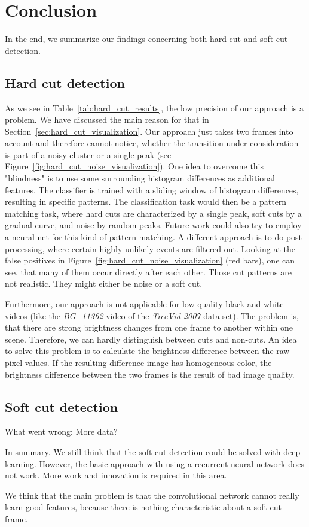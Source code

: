 \section{Conclusion}
\label{sec:conclusion}
In the end, we summarize our findings concerning both hard cut and soft cut detection.

\subsection{Hard cut detection}
\label{sec:conclusion_hard_cut}

As we see in Table~\ref{tab:hard_cut_results}, the low precision of our approach is a problem.
We have discussed the main reason for that in Section~\ref{sec:hard_cut_visualization}.
Our approach just takes two frames into account and therefore cannot notice, whether the transition under consideration is part of a noisy cluster or a single peak (see Figure~\ref{fig:hard_cut_noise_visualization}).
One idea to overcome this "blindness" is to use some surrounding histogram differences as additional features.
The classifier is trained with a sliding window of histogram differences, resulting in specific patterns.
The classification task would then be a pattern matching task, where hard cuts are characterized by a single peak, soft cuts by a gradual curve, and noise by random peaks.
Future work could also try to employ a neural net for this kind of pattern matching.
A different approach is to do post-processing, where certain highly unlikely events are filtered out.
Looking at the false positives in Figure~\ref{fig:hard_cut_noise_visualization} (red bars), one can see, that many of them occur directly after each other.
Those cut patterns are not realistic.
They might either be noise or a soft cut.

Furthermore, our approach is not applicable for low quality black and white videos (like the \emph{BG\_11362} video of the \emph{TrecVid 2007} data set).
The problem is, that there are strong brightness changes from one frame to another within one scene.
Therefore, we can hardly distinguish between cuts and non-cuts.
An idea to solve this problem is to calculate the brightness difference between the raw pixel values.
If the resulting difference image has homogeneous color, the brightness difference between the two frames is the result of bad image quality.


\subsection{Soft cut detection}
\label{sec:conclusion_hard_cut}

What went wrong:
More data?

In summary.
We still think that the soft cut detection could be solved with deep learning.
However, the basic approach with using a recurrent neural network does not work.
More work and innovation is required in this area.

We think that the main problem is that the convolutional network cannot really learn good features, because there is nothing characteristic about a soft cut frame.
